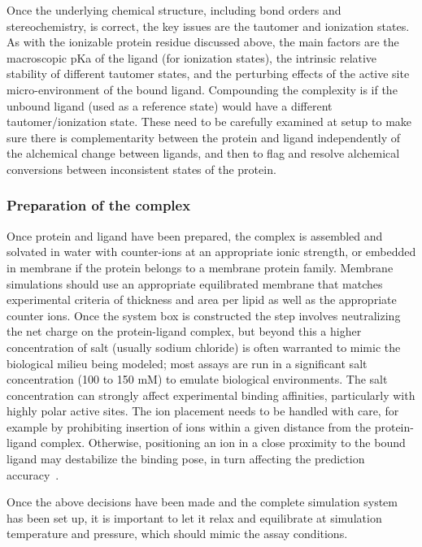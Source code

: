 \documentclass[9pt,bestpractices]{livecoms}
\begin{document}
Once the underlying chemical structure, including bond orders and stereochemistry, is correct, the key issues are the  tautomer and ionization states. As with the ionizable protein residue discussed above, the main factors are the macroscopic pKa of the ligand (for ionization states), the intrinsic relative stability of different tautomer states, and the perturbing effects of the active site micro-environment of the bound ligand. Compounding the complexity is if the unbound ligand (used as a reference state) would have a different tautomer/ionization state. These need to be carefully examined at setup to make sure there is complementarity between the protein and ligand independently of the alchemical change between ligands, and then to flag and resolve alchemical conversions between inconsistent states of the protein.

\subsubsection{Preparation of the complex}

Once protein and ligand have been prepared, the complex is assembled and solvated in water with counter-ions at an appropriate ionic strength, or embedded in membrane if the protein belongs to a membrane protein family. Membrane simulations should use an appropriate equilibrated membrane that matches experimental criteria of thickness and area per lipid as well as the appropriate counter ions. Once the system box is constructed the step involves neutralizing the net charge on the protein-ligand complex, but beyond this a higher concentration of salt (usually sodium chloride) is often warranted to mimic the biological milieu being modeled; most assays are run in a significant salt concentration (100 to 150 mM) to emulate biological environments. The salt concentration can strongly affect experimental binding affinities, particularly with highly polar active sites. The ion placement needs to be handled with care, for example by prohibiting insertion of ions within a given distance from the protein-ligand complex. Otherwise, positioning an ion in a close proximity to the bound ligand may destabilize the binding pose, in turn affecting the prediction accuracy~\cite{aldeghi2018resistance}. 

Once the above decisions have been made and the complete simulation system has been set up, it is important to let it relax and equilibrate at simulation temperature and pressure, which should mimic the assay conditions.
\end{document}
